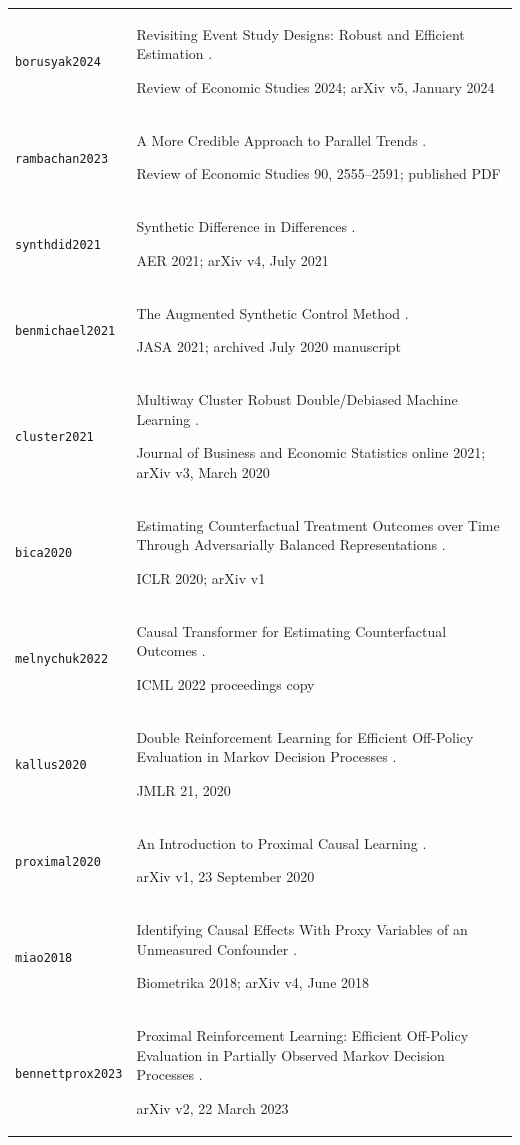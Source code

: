 \begin{longtable}{P{32mm}P{112mm}}
{\scriptsize\texttt{borusyak2024}} & Revisiting Event Study Designs: Robust and Efficient Estimation \citep{borusyak2024}.\par Review of Economic Studies 2024; arXiv v5, January 2024\\
{\scriptsize\texttt{rambachan2023}} & A More Credible Approach to Parallel Trends \citep{rambachan2023}.\par Review of Economic Studies 90, 2555–2591; published PDF\\
{\scriptsize\texttt{synthdid2021}} & Synthetic Difference in Differences \citep{synthdid2021}.\par AER 2021; arXiv v4, July 2021\\
{\scriptsize\texttt{benmichael2021}} & The Augmented Synthetic Control Method \citep{benmichael2021}.\par JASA 2021; archived July 2020 manuscript\\
{\scriptsize\texttt{cluster2021}} & Multiway Cluster Robust Double/Debiased Machine Learning \citep{cluster2021}.\par Journal of Business and Economic Statistics online 2021; arXiv v3, March 2020\\
{\scriptsize\texttt{bica2020}} & Estimating Counterfactual Treatment Outcomes over Time Through Adversarially Balanced Representations \citep{bica2020}.\par ICLR 2020; arXiv v1\\
{\scriptsize\texttt{melnychuk2022}} & Causal Transformer for Estimating Counterfactual Outcomes \citep{melnychuk2022}.\par ICML 2022 proceedings copy\\
{\scriptsize\texttt{kallus2020}} & Double Reinforcement Learning for Efficient Off-Policy Evaluation in Markov Decision Processes \citep{kallus2020}.\par JMLR 21, 2020\\
{\scriptsize\texttt{proximal2020}} & An Introduction to Proximal Causal Learning \citep{proximal2020}.\par arXiv v1, 23 September 2020\\
{\scriptsize\texttt{miao2018}} & Identifying Causal Effects With Proxy Variables of an Unmeasured Confounder \citep{miao2018}.\par Biometrika 2018; arXiv v4, June 2018\\
{\scriptsize\texttt{bennettprox2023}} & Proximal Reinforcement Learning: Efficient Off-Policy Evaluation in Partially Observed Markov Decision Processes \citep{bennettprox2023}.\par arXiv v2, 22 March 2023\\

\end{longtable}
